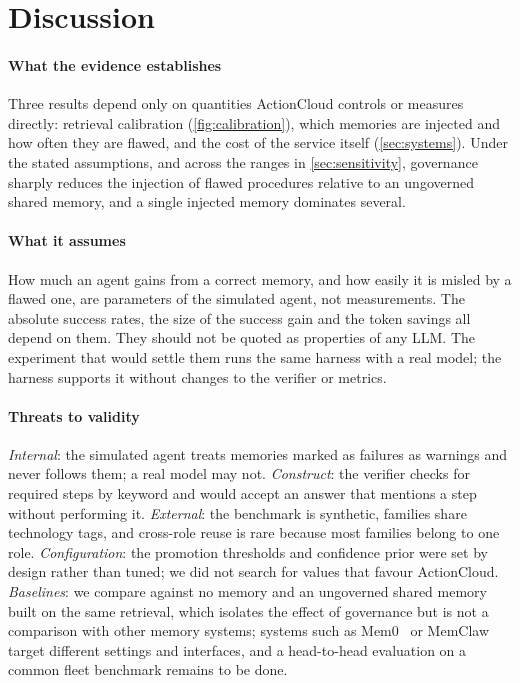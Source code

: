 \documentclass[5p,times,twocolumn]{elsarticle}
\newcommand{\sysname}{ActionCloud}
\begin{document}
\section{Discussion}
\label{sec:discussion}

\paragraph{What the evidence establishes}
Three results depend only on quantities \sysname{} controls or measures directly: retrieval calibration (\cref{fig:calibration}), which memories are injected and how often they are flawed, and the cost of the service itself (\cref{sec:systems}). Under the stated assumptions, and across the ranges in \cref{sec:sensitivity}, governance sharply reduces the injection of flawed procedures relative to an ungoverned shared memory, and a single injected memory dominates several.

\paragraph{What it assumes}
How much an agent gains from a correct memory, and how easily it is misled by a flawed one, are parameters of the simulated agent, not measurements. The absolute success rates, the size of the success gain and the token savings all depend on them. They should not be quoted as properties of any LLM. The experiment that would settle them runs the same harness with a real model; the harness supports it without changes to the verifier or metrics.

\paragraph{Threats to validity}
\emph{Internal}: the simulated agent treats memories marked as failures as warnings and never follows them; a real model may not. \emph{Construct}: the verifier checks for required steps by keyword and would accept an answer that mentions a step without performing it. \emph{External}: the benchmark is synthetic, families share technology tags, and cross-role reuse is rare because most families belong to one role. \emph{Configuration}: the promotion thresholds and confidence prior were set by design rather than tuned; we did not search for values that favour \sysname{}. \emph{Baselines}: we compare against no memory and an ungoverned shared memory built on the same retrieval, which isolates the effect of governance but is not a comparison with other memory systems; systems such as Mem0~\cite{chhikara2025mem0} or MemClaw~\cite{margalit2026governed} target different settings and interfaces, and a head-to-head evaluation on a common fleet benchmark remains to be done.
\end{document}
